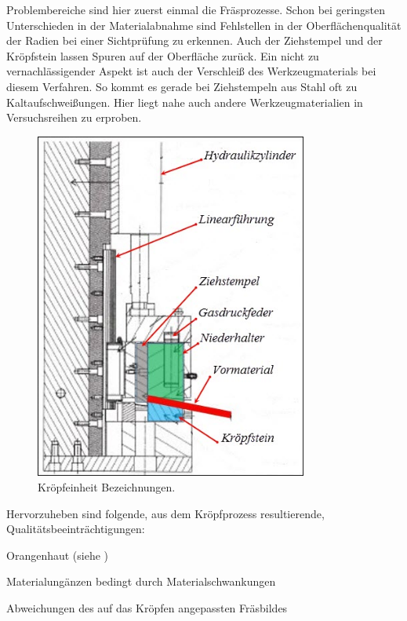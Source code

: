 \documentclass[12pt,a4paper,parskip,twoside,BCOR5mm,headsepline]{scrartcl}
\begin{document}
\begin{description*}
 
Problembereiche sind hier zuerst einmal die Fräsprozesse. Schon bei geringsten Unterschieden in der Materialabnahme sind Fehlstellen in der Oberflächenqualität der Radien bei einer Sichtprüfung zu erkennen. Auch der Ziehstempel und der Kröpfstein lassen Spuren auf der Oberfläche zurück. Ein nicht zu vernachlässigender Aspekt ist auch der Verschleiß des Werkzeugmaterials bei diesem Verfahren. So kommt es gerade bei Ziehstempeln aus Stahl oft zu Kaltaufschweißungen. Hier liegt nahe auch andere Werkzeugmaterialien in Versuchsreihen zu erproben.
\begin{figure}[hbtp]
\centering
\includegraphics[width=0.8\textwidth]{kropfeinpic}
\caption{Kröpfeinheit Bezeichnungen.}
\label{krofpfarbbezeich}
\end{figure}





\medskip

Hervorzuheben sind folgende, aus dem Kröpfprozess resultierende, Qualitätsbeeinträchtigungen:
\newpage
\begin{itemize*}
\item Orangenhaut (siehe )
\item Materialungänzen bedingt durch Materialschwankungen
\item Abweichungen des auf das Kröpfen angepassten Fräsbildes
\end{itemize*}


\end{description*}
\end{document}
